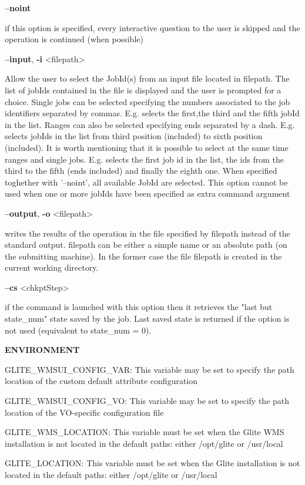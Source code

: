 {\textbf{--noint}

if this option is specified, every interactive question to the user is skipped and the operation is continued (when possible)

\textbf{--input}, \textbf{-i} <filepath>

Allow the user to select the JobId(s) from an input file located in filepath.
The list of jobIds contained in the file is displayed and the user is prompted for a choice. Single jobs can be selected specifying the numbers associated to the job identifiers separated by commas. E.g. selects the first,the third and the fifth jobId in the list.
Ranges can also be selected specifying ends separated by a dash. E.g. selects jobIds in the list from third position (included) to sixth position (included). It is worth mentioning that it is possible to select at the same time ranges and single jobs. E.g. selects the first job id in the list, the ids from the third to the fifth (ends included) and finally the eighth one.
When specified toghether with '--noint', all available JobId are selected.
This option cannot be used when one or more jobIds have been specified as extra command argument

\textbf{--output}, \textbf{-o} <filepath>

writes the results of the operation in the file specified by filepath instead of the standard output. filepath can be either a simple name or an absolute path (on the submitting machine). In the former case the file filepath is created in the current working directory.

\textbf{--cs} <chkptStep>

if the command is launched with this option then it retrieves the "last but state\_num" state saved by the job.
Last saved state is returned if the option is not used (equivalent to state\_num = 0).


\medskip
\textbf{ENVIRONMENT}
\smallskip


GLITE\_WMSUI\_CONFIG\_VAR:  This variable may be set to specify the path location of the custom default attribute configuration

GLITE\_WMSUI\_CONFIG\_VO: This variable may be set to specify the path location of the VO-specific configuration file

GLITE\_WMS\_LOCATION:  This variable must be set when the Glite WMS installation is not located in the default paths: either /opt/glite or /usr/local

GLITE\_LOCATION: This variable must be set when the Glite installation is not located in the default paths: either /opt/glite or /usr/local


}
